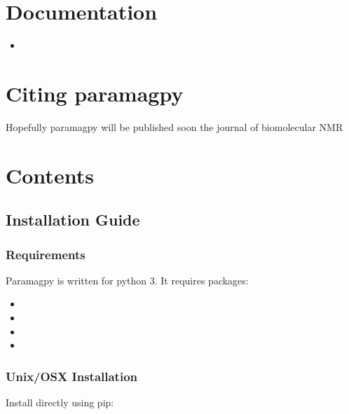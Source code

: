 \documentclass[a4paper,10pt,english,openany,oneside]{sphinxmanual}
\begin{document}
\chapter{Documentation}
\label{\detokenize{index:documentation}}\begin{itemize}
\item {} 

\end{itemize}


\chapter{Citing paramagpy}
\label{\detokenize{index:citing-paramagpy}}
Hopefully paramagpy will be published soon the journal of biomolecular NMR


\chapter{Contents}
\label{\detokenize{index:contents}}

\section{Installation Guide}
\label{\detokenize{install:installation-guide}}\label{\detokenize{install::doc}}

\subsection{Requirements}
\label{\detokenize{install:requirements}}
Paramagpy is written for python 3. It requires packages:
\begin{itemize}
\item {} 

\item {} 

\item {} 

\item {} 

\end{itemize}


\subsection{Unix/OSX Installation}
\label{\detokenize{install:unix-osx-installation}}
Install directly using pip:
\end{document}
